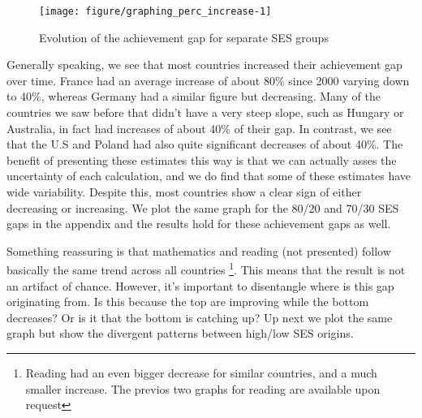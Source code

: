 \documentclass[11pt, a4paper]{article}\usepackage[]{graphicx}\usepackage[]{color}
\begin{document}


\begin{figure}

{\centering \texttt{[image: figure/graphing\_perc\_increase-1]} 

}

\caption[Evolution of the achievement gap for separate SES groups]{Evolution of the achievement gap for separate SES groups}\label{fig:graphing_perc_increase}
\end{figure}



Generally speaking, we see that most countries increased their achievement gap over time. France had an average increase of about 80\% since 2000 varying down to 40\%, whereas Germany had a similar figure but decreasing. Many of the countries we saw before that didn't have a very steep slope, such as Hungary or Australia, in fact had increases of about 40\% of their gap. In contrast, we see that the U.S and Poland had also quite significant decreases of about 40\%. The benefit of presenting these estimates this way is that we can actually asses the uncertainty of each calculation, and we do find that some of these estimates have wide variability. Despite this, most countries show a clear sign of either decreasing or increasing. We plot the same graph for the 80/20 and 70/30 SES gaps in the appendix and the results hold for these achievement gaps as well.



Something reassuring is that mathematics and reading (not presented) follow basically the same trend across all countries \footnote{Reading had an even bigger decrease for similar countries, and a much smaller increase. The previos two graphs for reading are available upon request}. This means that the result is not an artifact of chance. However, it's important to disentangle where is this gap originating from. Is this because the top are improving while the bottom decreases? Or is it that the bottom is catching up? Up next we plot the same graph but show the divergent patterns between high/low SES origins.
\end{document}
